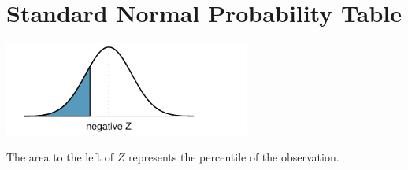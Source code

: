 \clearpage
\thispagestyle{empty}

\section{Standard Normal Probability Table}
\label{normalProbabilityTable2}

\vspace{-0.5cm}

\begin{table}[H]
\begin{center}{\small
\includegraphics[width=81mm]{extraTeX/appendix/figures/normalTails/normalTailLeft} \vspace{2mm} \\

\vspace{-0.5cm}

\begin{flushleft}
The area to the left of $Z$ represents the percentile of the observation.\\
\end{flushleft}


\small{
\noindent
}

}
\end{center}
\end{table}
